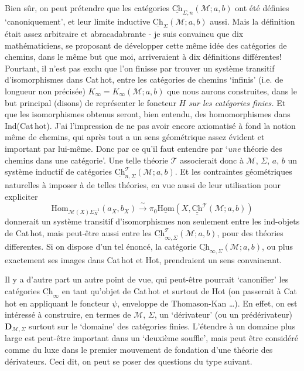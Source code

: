 \documentclass[11pt]{article}
\newcommand{\msp}[1]{\marginpar{\footnotesize [#1]}}
\newcommand{\uHom}{\underline{\mathrm{Hom}}}
\newcommand{\Hom}{\mathrm{Hom}}
\newcommand{\uCh}{\underline{\mathrm{Ch}}}
\newcommand{\Ch}{\underline{\mathrm{Ch}}}
\newcommand{\Chh}{\underline{\underline{\mathrm{Ch}}}}
\begin{document}
Bien sûr, on peut prétendre que les catégories $\uCh_{\Sigma,n}(\mathcal{M}; a, b)$ ont été définies `canoniquement', et leur limite inductive $\uCh_{\Sigma}(\mathcal{M}; a, b)$ aussi. Mais la définition était assez arbitraire et abracadabrante - je suis convaincu que dix mathématiciens, se proposant de développer cette même idée des catégories de chemins, dans le même but que moi, arriveraient à dix définitions différentes! Pourtant, il n'est pas exclu que l'on finisse par trouver un système transitif d'isomorphismes dans Cat\,hot, entre les catégories de chemins `infinis' (i.e. de longueur non précisée) $K_\infty = K_\infty(\mathcal{M}; a, b)$ que nous aurons construites, dans le but
\msp{page 50}
principal (disons) de représenter le foncteur $H$ \textit{sur les catégories finies.} Et que les isomorphismes obtenus seront, bien entendu, des homomorphismes dans Ind(Cat\,hot). J'ai l'impression de ne pas avoir encore axiomatisé à fond la notion même de chemins, qui après tout a un sens géométrique assez évident et important par lui-même. Donc par ce qu'il faut entendre par `\textit{une} théorie des chemins dans une catégorie'. Une telle théorie $\mathcal{T}$ associerait donc à $\mathcal{M}$, $\Sigma$, $a$, $b$ un système inductif de catégories $\Ch^{\mathcal{T}}_{n,\Sigma}(\mathcal{M}; a, b)$. Et les contraintes géométriques naturelles à imposer à de telles théories, en vue aussi de leur utilisation pour expliciter
\[
\Hom_{\mathcal{M}(X)\Sigma_X^{-1}}(a_X, b_X) \xrightarrow{\ \sim\ } \pi_0\uHom(X, \Chh^{\mathcal{T}}(\mathcal{M}; a, b)) %
\]
donnerait un système transitif d'isomorphismes non seulement entre les ind-objets de Cat\,hot, mais peut-être aussi entre les $\Ch^{\mathcal{T}}_{\infty,\Sigma}(\mathcal{M}; a, b)$, pour des théories differentes. Si on dispose d'un tel énoncé, la catégorie $\Ch_{\infty,\Sigma}(\mathcal{M}; a, b)$, ou plus exactement ses images dans Cat\,hot et Hot, %
\msp{page 51}
prendraient un sens convaincant.

Il y a d'autre part un autre point de vue, qui peut-être pourrait `canonifier' les catégories $\uCh_\infty$ en tant qu'objet de Cat\,hot et surtout de Hot (on passerait à Cat\,hot en appliquant le foncteur $\psi$, enveloppe de Thomason-Kan \ldots). En effet, on est intéressé à construire, en termes de $\mathcal{M}$, $\Sigma$, un `dérivateur' (ou un prédérivateur) $\mathbf{D}_{\mathcal{M},\Sigma}$ surtout sur le `domaine' des catégories finies. L'étendre à un domaine plus large est peut-être important dans un `deuxième souffle', mais peut être considéré comme du luxe dans le premier mouvement de fondation d'une théorie des dérivateurs. Ceci dit, on peut se poser des questions du type suivant.
\end{document}
